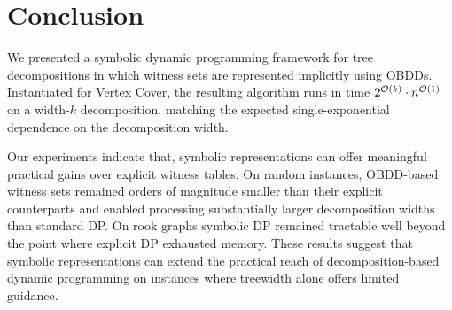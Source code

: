 

\section{Conclusion}

We presented a symbolic dynamic programming framework for tree decompositions in
which witness sets are represented implicitly using OBDDs. Instantiated for
{\sc Vertex Cover}, the resulting algorithm runs in time
$2^{\mathcal{O}(k)}\cdot n^{\mathcal{O}(1)}$ on a width-$k$ decomposition, matching the
expected single-exponential dependence on the decomposition width.

Our experiments indicate that, symbolic representations can offer meaningful practical gains over explicit witness tables. On random instances, OBDD-based witness sets remained orders of magnitude
smaller than their explicit counterparts and enabled processing substantially
larger decomposition widths than standard DP. On rook graphs symbolic DP remained tractable well beyond the point where explicit
DP exhausted memory. These results suggest that symbolic representations can
extend the practical reach of decomposition-based dynamic programming on
instances where treewidth alone offers limited guidance.